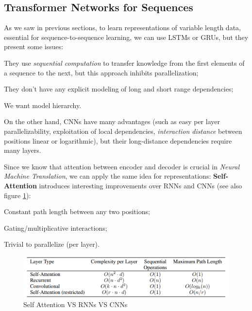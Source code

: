 \subsection{Transformer Networks for Sequences}\label{sec:seq-transformers}

As we saw in previous sections, to learn representations of variable length data, essential for sequence-to-sequence learning, we can use LSTMs or GRUs, but they present some issues:
\begin{myitem}
    \item They use \textit{sequential computation} to transfer knowledge from the first elements of a sequence to the next, but this approach inhibits parallelization;
    \item They don't have any explicit modeling of long and short range dependencies;
    \item We want model hierarchy.
\end{myitem}

On the other hand, CNNs have many advantages (such as easy per layer parallelizability, exploitation of local dependencies, \textit{interaction distance} between positions linear or logarithmic), but their long-distance dependencies require many layers.

Since we know that attention between encoder and decoder is crucial in \textit{Neural Machine Translation}, we can apply the same idea for representations: \textbf{Self-Attention} introduces interesting improvements over RNNs and CNNs (see also figure \ref{fig:seq-self-attention}):
\begin{myitem}
    \item Constant path length between any two positions;
    \item Gating/multiplicative interactions;
    \item Trivial to parallelize (per layer).
\end{myitem}

\begin{figure}[h!]
    \centering
    \includegraphics[width=0.7\linewidth]{images/seq-self-attention}
    \caption[Self Attention VS RNNs VS CNNs]{Self Attention VS RNNs VS CNNs}
    \label{fig:seq-self-attention}
\end{figure}

